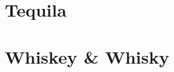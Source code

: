 \documentclass{family_cookbook}
\begin{document}
\section{Tequila}
{%
	\let\section\subsection%
	\let\subsection\subsubsection%
	
	
	
	
	
	
	
	
}

\section{Whiskey \& Whisky}
{%
	\let\section\subsection%
	\let\subsection\subsubsection%
	
	
	
	
	
	
	
}
\end{document}
